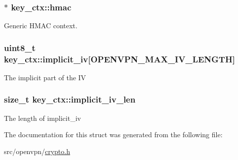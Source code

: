 \subsubsection[{hmac}]{$\ast$ key\+\_\+ctx\+::hmac}\label{structkey__ctx_ac82e9ac5970ca208fa7d36c9a49bb4a7}
Generic H\+M\+A\+C context. \hypertarget{structkey__ctx_a3abf80e0721314aa5ae121fa668620a7}{}
\subsubsection[{implicit\+\_\+iv}]{\setlength{\rightskip}{0pt plus 5cm}uint8\+\_\+t key\+\_\+ctx\+::implicit\+\_\+iv\mbox{[}{\bf O\+P\+E\+N\+V\+P\+N\+\_\+\+M\+A\+X\+\_\+\+I\+V\+\_\+\+L\+E\+N\+G\+T\+H}\mbox{]}}\label{structkey__ctx_a3abf80e0721314aa5ae121fa668620a7}
The implicit part of the I\+V \hypertarget{structkey__ctx_a094aa3b3f35e7d15ac58d5e4ef072eaa}{}
\subsubsection[{implicit\+\_\+iv\+\_\+len}]{\setlength{\rightskip}{0pt plus 5cm}size\+\_\+t key\+\_\+ctx\+::implicit\+\_\+iv\+\_\+len}\label{structkey__ctx_a094aa3b3f35e7d15ac58d5e4ef072eaa}
The length of implicit\+\_\+iv 

The documentation for this struct was generated from the following file\+:\begin{DoxyCompactItemize}
\item 
src/openvpn/\hyperlink{crypto_8h}{crypto.\+h}\end{DoxyCompactItemize}
